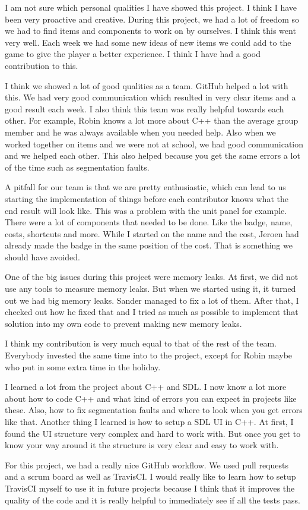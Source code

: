 I am not sure which personal qualities I have showed this project. I think I have been very proactive and creative. During this project, we had a lot of freedom so we had to find items and components to work on by ourselves. I think this went very well. Each week we had some new ideas of new items we could add to the game to give the player a better experience. I think I have had a good contribution to this. 

I think we showed a lot of good qualities as a team. GitHub helped a lot with this. We had very good communication which resulted in very clear items and a good result each week. I also think this team was really helpful towards each other. For example, Robin knows a lot more about C++ than the average group member and he was always available when you needed help. Also when we worked together on items and we were not at school, we had good communication and we helped each other. This also helped because you get the same errors a lot of the time such as segmentation faults.

A pitfall for our team is that we are pretty enthusiastic, which can lead to us starting the implementation of things before each contributor knows what the end result will look like. This was a problem with the unit panel for example. There were a lot of components that needed to be done. Like the badge, name, costs, shortcuts and more. While I started on the name and the cost, Jeroen had already made the badge in the same position of the cost. That is something we should have avoided.

One of the big issues during this project were memory leaks. At first, we did not use any tools to measure memory leaks. But when we started using it, it turned out we had big memory leaks. Sander managed to fix a lot of them. After that, I checked out how he fixed that and I tried as much as possible to implement that solution into my own code to prevent making new memory leaks.

I think my contribution is very much equal to that of the rest of the team. Everybody invested the same time into to the project, except for Robin maybe who put in some extra time in the holiday. 

I learned a lot from the project about C++ and SDL. I now know a lot more about how to code C++ and what kind of errors you can expect in projects like these. Also, how to fix segmentation faults and where to look when you get errors like that. Another thing I learned is how to setup a SDL UI in C++. At first, I found the UI structure very complex and hard to work with. But once you get to know your way around it the structure is very clear and easy to work with. 

For this project, we had a really nice GitHub workflow. We used pull requests and a scrum board as well as TravisCI. I would really like to learn how to setup TravisCI myself to use it in future projects because I think that it improves the quality of the code and it is really helpful to immediately see if all the tests pass.